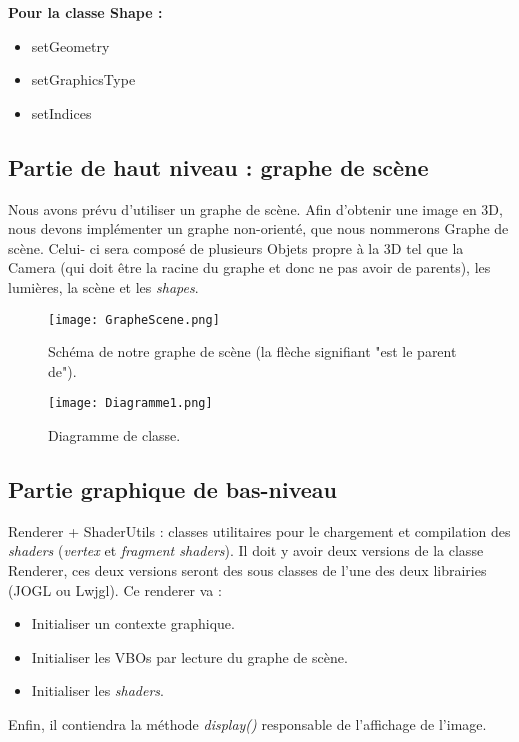 \documentclass[11pt]{report}
\begin{document}
\textbf{Pour la classe Shape :}
\begin{itemize}
\item setGeometry %
\item setGraphicsType
\item setIndices %
\end{itemize}

\subsection{Partie de haut niveau : graphe de scène}
Nous avons prévu d'utiliser un graphe de scène. 
Afin d'obtenir une image en 3D, nous devons implémenter un graphe non-orienté, que nous nommerons Graphe de scène. Celui- ci sera composé de plusieurs Objets propre à la 3D tel que la Camera (qui doit être la racine du graphe et donc ne pas avoir de parents), les lumières, la scène et les  \textit{shapes}. 

\begin{figure}[h!]
  \caption{Schéma de notre graphe de scène (la flèche signifiant "est le parent de").}
  \centering
    \texttt{[image: GrapheScene.png]} 
    \label{SchemaGrapheSceneSimple}
\end{figure}
 
\begin{figure}[h!]
  \caption{Diagramme de classe.}
  \centering
    \texttt{[image: Diagramme1.png]}
\end{figure}
 




\subsection{Partie graphique de bas-niveau}
Renderer + ShaderUtils : classes utilitaires pour le chargement et compilation des \textit{shaders} (\textit{vertex} et \textit{fragment shaders}).
Il doit y avoir deux versions de la classe Renderer, ces deux versions seront des sous classes de l'une des deux librairies (JOGL ou Lwjgl).
Ce renderer va :
\begin{itemize}
\item Initialiser un contexte graphique. %
\item Initialiser les VBOs par lecture du graphe de scène.
\item Initialiser les \textit{shaders}. %
\end{itemize}
Enfin, il contiendra la méthode \textit{display()} responsable de l'affichage de l'image.
\end{document}
